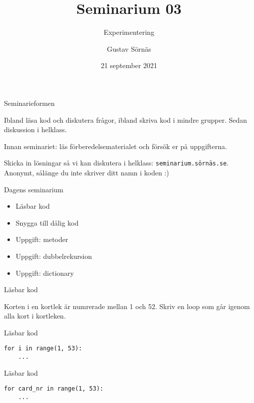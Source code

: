 \documentclass{beamer}
\title{Seminarium 03}
\subtitle{Experimentering}
\date{21 september 2021}
\author{Gustav Sörnäs}
\begin{document}
  \frame{\titlepage}

  \begin{frame}{Seminarieformen}

    Ibland läsa kod och diskutera frågor, ibland skriva kod i mindre grupper.
    Sedan diskussion i helklass.

    Innan seminariet: läs förberedelsematerialet och försök er på uppgifterna.

    Skicka in lösningar så vi kan diskutera i helklass:
    \texttt{seminarium.sörnäs.se}. Anonymt, sålänge du inte skriver ditt namn i
    koden :)

  \end{frame}

  \begin{frame}{Dagens seminarium}

    \begin{itemize}
      \item Läsbar kod
      \item Snygga till dålig kod
      \item Uppgift: metoder
      \item Uppgift: dubbelrekursion
      \item Uppgift: dictionary
    \end{itemize}

  \end{frame}

  \begin{frame}{Läsbar kod}

    Korten i en kortlek är numrerade mellan 1 och 52. Skriv en loop som går
    igenom alla kort i kortleken.

  \end{frame}

  \begin{frame}[fragile]{Läsbar kod}

    \begin{verbatim}
for i in range(1, 53):
    ...
    \end{verbatim}

  \end{frame}

  \begin{frame}[fragile]{Läsbar kod}

    \begin{verbatim}
for card_nr in range(1, 53):
    ...
    \end{verbatim}

  \end{frame}
\end{document}
